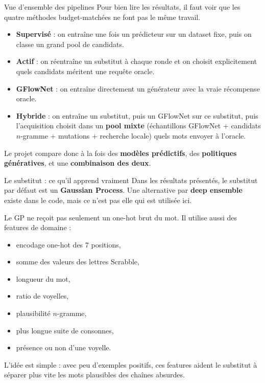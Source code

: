 \documentclass[aspectratio=169,10pt]{beamer}
\begin{document}
\begin{frame}{Vue d'ensemble des pipelines}
\justifying
Pour bien lire les résultats, il faut voir que les quatre méthodes
budget-matchées ne font pas le même travail.

\vspace{0.5em}
\begin{itemize}
  \item \textbf{Supervisé} : on entraîne une fois un prédicteur sur un dataset
  fixe, puis on classe un grand pool de candidats.
  \item \textbf{Actif} : on réentraîne un substitut à chaque ronde et on
  choisit explicitement quels candidats méritent une requête oracle.
  \item \textbf{GFlowNet} : on entraîne directement un générateur avec la vraie
  récompense oracle.
  \item \textbf{Hybride} : on entraîne un substitut, puis un GFlowNet sur ce
  substitut, puis l'acquisition choisit dans un \textbf{pool mixte}
  (échantillons GFlowNet + candidats \(n\)-gramme + mutations + recherche
  locale) quels mots envoyer à l'oracle.
\end{itemize}

\vspace{0.5em}
Le projet compare donc à la fois des \textbf{modèles prédictifs}, des
\textbf{politiques génératives}, et une \textbf{combinaison des deux}.
\end{frame}

\begin{frame}{Le substitut : ce qu'il apprend vraiment}
\justifying
Dans les résultats présentés, le substitut par défaut est un
\textbf{Gaussian Process}. Une alternative par \textbf{deep ensemble} existe
dans le code, mais ce n'est pas elle qui est utilisée ici.

\vspace{0.5em}
Le GP ne reçoit pas seulement un one-hot brut du mot. Il utilise aussi des
features de domaine :
\begin{itemize}
  \item encodage one-hot des \(7\) positions,
  \item somme des valeurs des lettres Scrabble,
  \item longueur du mot,
  \item ratio de voyelles,
  \item plausibilité \(n\)-gramme,
  \item plus longue suite de consonnes,
  \item présence ou non d'une voyelle.
\end{itemize}

\vspace{0.5em}
L'idée est simple : avec peu d'exemples positifs, ces features aident le
substitut à séparer plus vite les mots plausibles des chaînes absurdes.
\end{frame}
\end{document}
